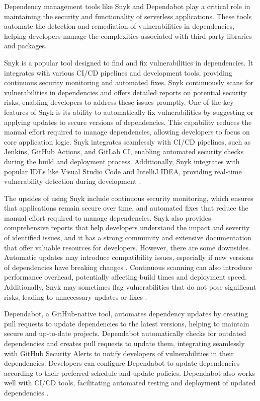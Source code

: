 \documentclass[12pt, letterpaper]{article}
\begin{document}
Dependency management tools like Snyk and Dependabot play a critical role in maintaining the security and functionality of serverless applications. These tools automate the detection and remediation of vulnerabilities in dependencies, helping developers manage the complexities associated with third-party libraries and packages.

Snyk is a popular tool designed to find and fix vulnerabilities in dependencies. It integrates with various CI/CD pipelines and development tools, providing continuous security monitoring and automated fixes. Snyk continuously scans for vulnerabilities in dependencies and offers detailed reports on potential security risks, enabling developers to address these issues promptly. One of the key features of Snyk is its ability to automatically fix vulnerabilities by suggesting or applying updates to secure versions of dependencies. This capability reduces the manual effort required to manage dependencies, allowing developers to focus on core application logic. Snyk integrates seamlessly with CI/CD pipelines, such as Jenkins, GitHub Actions, and GitLab CI, enabling automated security checks during the build and deployment process. Additionally, Snyk integrates with popular IDEs like Visual Studio Code and IntelliJ IDEA, providing real-time vulnerability detection during development \cite{snyk2023, snykIDE2023}.

The upsides of using Snyk include continuous security monitoring, which ensures that applications remain secure over time, and automated fixes that reduce the manual effort required to manage dependencies. Snyk also provides comprehensive reports that help developers understand the impact and severity of identified issues, and it has a strong community and extensive documentation that offer valuable resources for developers. However, there are some downsides. Automatic updates may introduce compatibility issues, especially if new versions of dependencies have breaking changes \cite{benischke2023updates}. Continuous scanning can also introduce performance overhead, potentially affecting build times and deployment speed. Additionally, Snyk may sometimes flag vulnerabilities that do not pose significant risks, leading to unnecessary updates or fixes \cite{snykFalsePositives2023}.

Dependabot, a GitHub-native tool, automates dependency updates by creating pull requests to update dependencies to the latest versions, helping to maintain secure and up-to-date projects. Dependabot automatically checks for outdated dependencies and creates pull requests to update them, integrating seamlessly with GitHub Security Alerts to notify developers of vulnerabilities in their dependencies. Developers can configure Dependabot to update dependencies according to their preferred schedule and update policies. Dependabot also works well with CI/CD tools, facilitating automated testing and deployment of updated dependencies \cite{dependabot2023}.
\end{document}
